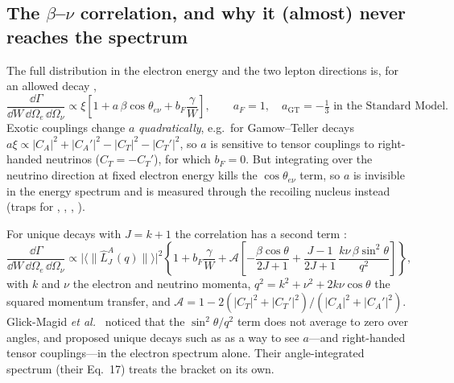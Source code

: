 \subsection{The $\beta$--$\nu$ correlation, and why it (almost) never reaches the spectrum}
\label{sec:corr}
The full distribution in the electron energy and the two lepton directions is, for an allowed decay \cite{jtw},
\begin{equation}
\frac{\dd\Gamma}{\dd W\,\dd\Omega_e\,\dd\Omega_\nu} \propto \xi\left[1 + a\,\beta\cos\theta_{e\nu} + b_F\frac{\gamma}{W}\right],
\qquad a_F = 1,\quad a_\text{GT} = -\tfrac13 \text{ in the Standard Model}.
\end{equation}
Exotic couplings change $a$ \emph{quadratically}, e.g.\ for Gamow--Teller decays $a\xi \propto |C_A|^2 + |C_A'|^2 - |C_T|^2 - |C_T'|^2$, so $a$ is sensitive to tensor couplings to right-handed neutrinos ($C_T = -C_T'$), for which $b_F = 0$. But integrating over the neutrino direction at fixed electron energy kills the $\cos\theta_{e\nu}$ term, so $a$ is invisible in the energy spectrum and is measured through the recoiling nucleus instead (traps for , , , ).

For unique decays with $J = k+1$ the correlation has a second term \cite{gm17,gm23}:
\begin{equation}
\frac{\dd\Gamma}{\dd W\,\dd\Omega_e\,\dd\Omega_\nu} \propto \big|\langle\|\hat L^A_J(q)\|\rangle\big|^2\left\{1 + b_F\frac{\gamma}{W} + \mathcal A\left[-\frac{\beta\cos\theta}{2J+1} + \frac{J-1}{2J+1}\,\frac{k\nu\,\beta\sin^2\theta}{q^2}\right]\right\},
\label{eq:uniquecorr}
\end{equation}
with $k$ and $\nu$ the electron and neutrino momenta, $q^2 = k^2 + \nu^2 + 2k\nu\cos\theta$ the squared momentum transfer, and $\mathcal A = 1 - 2(|C_T|^2+|C_T'|^2)/(|C_A|^2+|C_A'|^2)$. Glick-Magid \emph{et al.}\ \cite{gm17} noticed that the $\sin^2\theta/q^2$ term does not average to zero over angles, and proposed unique decays such as  as a way to see $a$---and right-handed tensor couplings---in the electron spectrum alone. Their angle-integrated spectrum (their Eq.~17) treats the bracket on its own.

